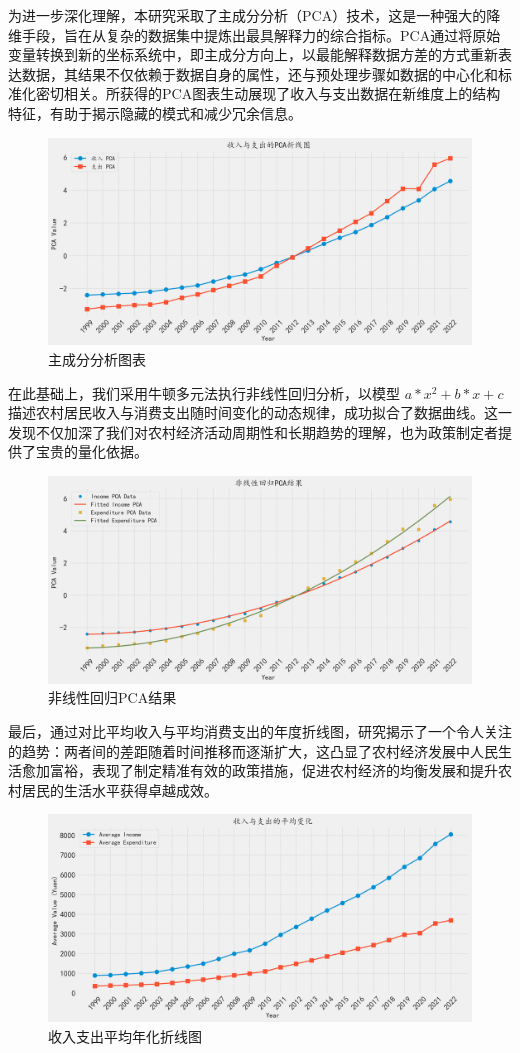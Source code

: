 为进一步深化理解，本研究采取了主成分分析（PCA）技术，这是一种强大的降维手段，旨在从复杂的数据集中提炼出最具解释力的综合指标。PCA通过将原始变量转换到新的坐标系统中，即主成分方向上，以最能解释数据方差的方式重新表达数据，其结果不仅依赖于数据自身的属性，还与预处理步骤如数据的中心化和标准化密切相关。所获得的PCA图表生动展现了收入与支出数据在新维度上的结构特征，有助于揭示隐藏的模式和减少冗余信息。

\begin{figure}[H]
    \centering
    \includegraphics[width=0.75\linewidth]{figures/PCA.png}
    \caption{主成分分析图表}
    \label{fig:PCA}
\end{figure}

在此基础上，我们采用牛顿多元法执行非线性回归分析，以模型 \(a * x^2 + b * x + c\) 描述农村居民收入与消费支出随时间变化的动态规律，成功拟合了数据曲线。这一发现不仅加深了我们对农村经济活动周期性和长期趋势的理解，也为政策制定者提供了宝贵的量化依据。

\begin{figure}[H]
    \centering
    \includegraphics[width=0.75\linewidth]{figures/poly_PCA.png}
    \caption{非线性回归PCA结果}
    \label{fig:poly_PCA}
\end{figure}

最后，通过对比平均收入与平均消费支出的年度折线图，研究揭示了一个令人关注的趋势：两者间的差距随着时间推移而逐渐扩大，这凸显了农村经济发展中人民生活愈加富裕，表现了制定精准有效的政策措施，促进农村经济的均衡发展和提升农村居民的生活水平获得卓越成效。

\begin{figure}[H]
    \centering
    \includegraphics[width=0.75\linewidth]{figures/average_change.png}
    \caption{收入支出平均年化折线图}
    \label{fig:average_change}
\end{figure}


